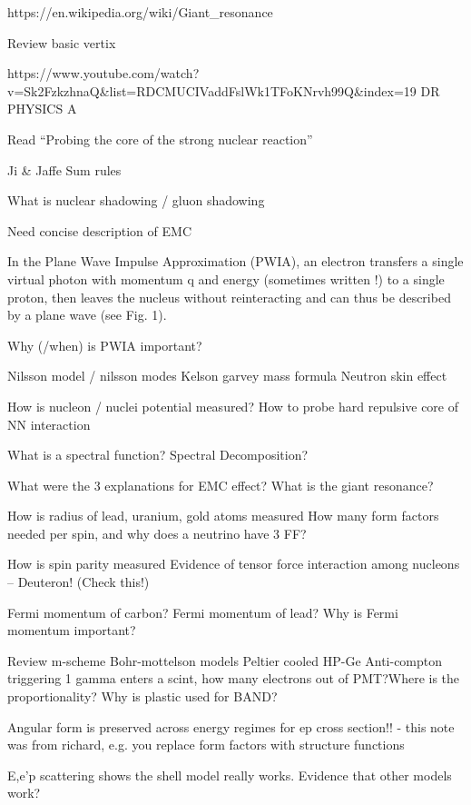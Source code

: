 https://en.wikipedia.org/wiki/Giant_resonance

Review basic vertix

https://www.youtube.com/watch?v=Sk2FzkzhnaQ&list=RDCMUCIVaddFslWk1TFoKNrvh99Q&index=19 DR PHYSICS A

Read “Probing the core of the strong nuclear reaction”

Ji & Jaffe Sum rules

What is nuclear shadowing / gluon shadowing

Need concise description of EMC

In the Plane Wave Impulse Approximation (PWIA),
an electron transfers a single virtual photon with momentum
q and energy (sometimes written !) to a single
proton, then leaves the nucleus without reinteracting
and can thus be described by a plane wave (see Fig. 1).

Why (/when) is PWIA important?

Nilsson model / nilsson modes
Kelson garvey mass formula
Neutron skin effect

How is nucleon / nuclei potential measured?
How to probe hard repulsive core of NN interaction

What is a spectral function? Spectral Decomposition?

What were the 3 explanations for EMC effect?
What is the giant resonance?

How is radius of lead, uranium, gold atoms measured
How many form factors needed per spin, and why does a neutrino have 3 FF?

How is spin parity measured
Evidence of tensor force interaction among nucleons – Deuteron! (Check this!)

Fermi momentum of carbon? Fermi momentum of lead? Why is Fermi momentum important?

Review m-scheme
Bohr-mottelson models
Peltier cooled HP-Ge
Anti-compton triggering
1 gamma enters a scint, how many electrons out of PMT?Where is the proportionality?
Why is plastic used for BAND?

Angular form is preserved across energy regimes for ep cross section!! - this note was from richard, e.g. you replace form factors with structure functions

E,e’p scattering shows the shell model really works. Evidence that other models work?

